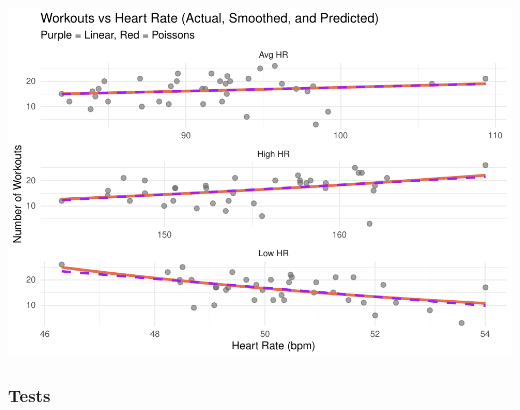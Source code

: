 \documentclass[
  11pt,
]{article}
\begin{document}
\includegraphics{analysis_files/figure-latex/unnamed-chunk-9-1.pdf}

\subsubsection{Tests}\label{tests}
\end{document}
